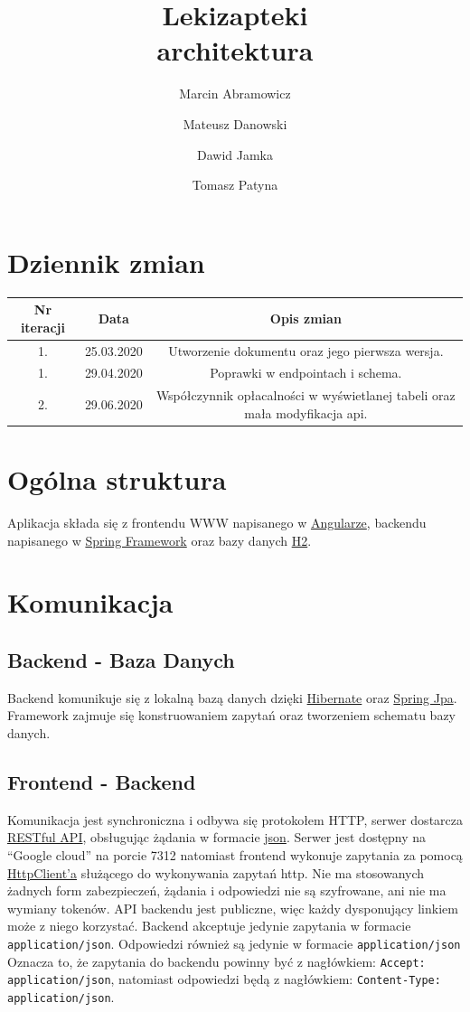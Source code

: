 \documentclass{article}
\title{
Lekizapteki\\
\large architektura}
\author{Marcin Abramowicz \and Mateusz Danowski \and Dawid Jamka \and Tomasz Patyna}
\begin{document}
  \maketitle

  \section{Dziennik zmian}
  \begin{tabular}{|c|c|c|}
    Nr iteracji & Data & Opis zmian \\
    \hline
    1. & 25.03.2020 & Utworzenie dokumentu oraz jego pierwsza wersja. \\
    \hline
    1. & 29.04.2020 & Poprawki w endpointach i schema. \\
    \hline
    2. & 29.06.2020 & Współczynnik opłacalności w wyświetlanej tabeli oraz mała modyfikacja api. \\
  \end{tabular}

  \section{Ogólna struktura}
  Aplikacja składa się z frontendu WWW napisanego w
  \href{https://angular.io}{Angularze}, backendu napisanego w
  \href{https://spring.io}{Spring Framework} oraz bazy danych
  \href {https://www.h2database.com/html/main.html}{H2}.

  \section{Komunikacja}
  \subsection{Backend - Baza Danych}
  Backend komunikuje się z lokalną bazą danych dzięki
  \href{https://hibernate.org}{Hibernate} oraz
  \href{https://spring.io/projects/spring-data-jpa} {Spring Jpa}.
  Framework zajmuje się konstruowaniem zapytań oraz tworzeniem schematu bazy danych.

  \subsection{Frontend - Backend}
  Komunikacja jest synchroniczna i odbywa się protokołem HTTP, serwer dostarcza
  \href{https://en.wikipedia.org/wiki/Representational_state_transfer}{RESTful API},
  obsługując żądania w formacie
  \href{https://en.wikipedia.org/wiki/JSON}{json}.
  Serwer jest dostępny na ``Google cloud'' na porcie 7312
  natomiast frontend wykonuje zapytania za pomocą
  \href{https://angular.io/guide/http}{HttpClient'a} służącego do wykonywania zapytań http.
  Nie ma stosowanych żadnych form zabezpieczeń, żądania i odpowiedzi nie są szyfrowane, ani nie ma wymiany tokenów.
  API backendu jest publiczne, więc każdy dysponujący linkiem może z niego korzystać.
  Backend akceptuje jedynie zapytania w formacie \texttt{application/json}.
  Odpowiedzi również są jedynie w formacie \texttt{application/json}
  Oznacza to, że zapytania do backendu powinny być z nagłówkiem: \texttt{Accept: application/json},
  natomiast odpowiedzi będą z nagłówkiem: \texttt{Content-Type: application/json}.
\end{document}
